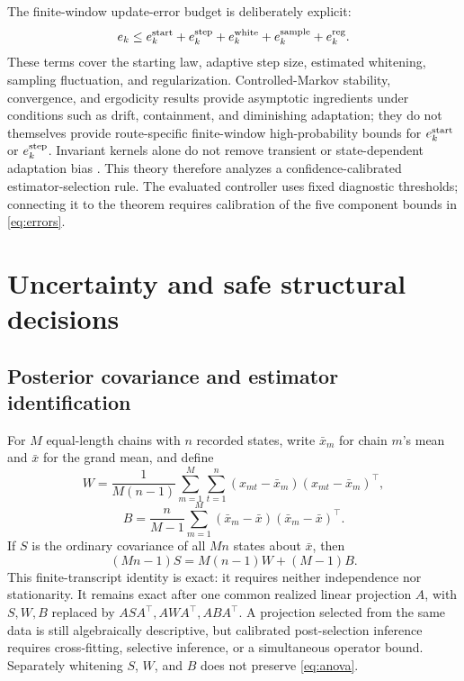 \documentclass[11pt]{article}
\theoremstyle{plain}
\theoremstyle{definition}
\theoremstyle{remark}
\begin{document}
The finite-window update-error budget is deliberately explicit:
\begin{equation}
 e_k\le e_k^{\rm start}+e_k^{\rm step}+e_k^{\rm white}
          +e_k^{\rm sample}+e_k^{\rm reg}.                   \label{eq:errors}
\end{equation}
These terms cover the starting law, adaptive step size, estimated whitening,
sampling fluctuation, and regularization. Controlled-Markov stability,
convergence, and ergodicity results provide asymptotic ingredients under
conditions such as drift, containment, and diminishing adaptation; they do not
themselves provide route-specific finite-window high-probability bounds for
$e_k^{\rm start}$ or $e_k^{\rm step}$. Invariant kernels alone do not remove
transient or state-dependent adaptation bias
\citep{andrieu2005stability,fort2016convergence,roberts2007coupling}.
This theory therefore analyzes a confidence-calibrated estimator-selection
rule. The evaluated controller uses fixed diagnostic thresholds; connecting it
to the theorem requires calibration of the five component bounds in
\eqref{eq:errors}.

\section{Uncertainty and safe structural decisions}\label{sec:ident}

\subsection{Posterior covariance and estimator identification}\label{sec:covbridge}

For $M$ equal-length chains with $n$ recorded states, write $\bar x_m$ for
chain $m$'s mean and $\bar x$ for the grand mean, and define
\[
 W=\frac{1}{M(n-1)}\sum_{m=1}^M\sum_{t=1}^n
 (x_{mt}-\bar x_m)(x_{mt}-\bar x_m)^\top,
\]
\[
 B=\frac{n}{M-1}\sum_{m=1}^M
 (\bar x_m-\bar x)(\bar x_m-\bar x)^\top.
\]
If $S$ is the ordinary covariance of all $Mn$ states about $\bar x$, then
\begin{equation}
 (Mn-1)S=M(n-1)W+(M-1)B.                                  \label{eq:anova}
\end{equation}
This finite-transcript identity is exact: it requires neither independence nor
stationarity. It remains exact after one common realized linear projection
$A$, with $S,W,B$ replaced by $ASA^\top,AWA^\top,ABA^\top$. A projection
selected from the same data is still algebraically descriptive, but calibrated
post-selection inference requires cross-fitting, selective inference, or a
simultaneous operator bound. Separately whitening $S$, $W$, and $B$ does not
preserve \eqref{eq:anova}.
\end{document}
